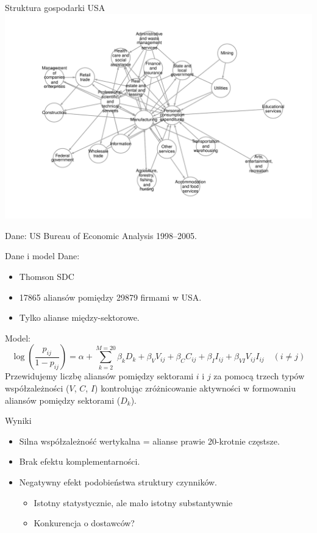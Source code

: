 \documentclass{beamer}
\begin{document}
\begin{frame}{Struktura gospodarki USA}
	\centering\includegraphics[width=\textwidth]{ioflowtop}

	Dane: US Bureau of Economic Analysis 1998--2005.
\end{frame}




\begin{frame}{Dane i model}
	Dane:
	\begin{itemize}
		\item Thomson SDC
		\item 17865 aliansów pomiędzy 29879 firmami w USA.
		\item Tylko alianse między-sektorowe.
	\end{itemize}

	Model:
	\begin{equation*}
		\log \left( \frac{p_{ij}}{1-p_{ij}} \right) =
		\alpha + \sum_{k=2}^{M=20} \beta_k D_k +
		\beta_V V_{ij} + \beta_C C_{ij} + \beta_I I_{ij} +
		\beta_{VI} V_{ij} I_{ij}
		\quad (i \neq j)
	\end{equation*}
	Przewidujemy liczbę aliansów pomiędzy sektorami $i$ i $j$ za pomocą trzech
	typów współzależności ($V$, $C$, $I$) kontrolując zróżnicowanie aktywności w
	formowaniu aliansów pomiędzy sektorami ($D_k$).
\end{frame}


\begin{frame}{Wyniki}
	\begin{itemize}
		\item Silna współzależność wertykalna = alianse prawie 20-krotnie częstsze.
		\item Brak efektu komplementarności.
		\item Negatywny efekt podobieństwa struktury czynników.
			\begin{footnotesize}
				\begin{itemize}
					\item Istotny statystycznie, ale mało istotny substantywnie
					\item Konkurencja o dostawców?
				\end{itemize}
			\end{footnotesize}
	\end{itemize}
\end{frame}
\end{document}
